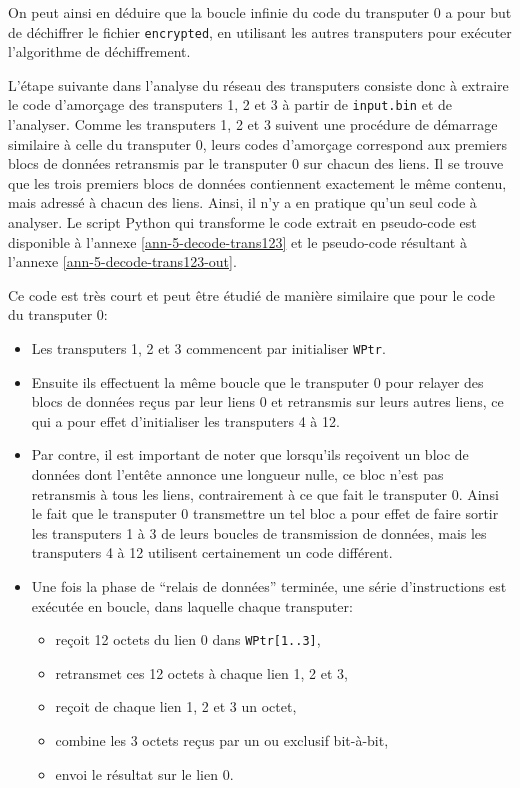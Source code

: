 \documentclass[a4paper,10pt]{article}
\begin{document}
On peut ainsi en déduire que la boucle infinie du code du transputer 0 a pour but de déchiffrer le fichier \texttt{encrypted}, en utilisant les autres transputers pour exécuter l'algorithme de déchiffrement.

L'étape suivante dans l'analyse du réseau des transputers consiste donc à extraire le code d'amorçage des transputers 1, 2 et 3 à partir de \texttt{input.bin} et de l'analyser.
Comme les transputers 1, 2 et 3 suivent une procédure de démarrage similaire à celle du transputer 0, leurs codes d'amorçage correspond aux premiers blocs de données retransmis par le transputer 0 sur chacun des liens.
Il se trouve que les trois premiers blocs de données contiennent exactement le même contenu, mais adressé à chacun des liens.
Ainsi, il n'y a en pratique qu'un seul code à analyser.
Le script Python qui transforme le code extrait en pseudo-code est disponible à l'annexe \ref{ann-5-decode-trans123} et le pseudo-code résultant à l'annexe \ref{ann-5-decode-trans123-out}.

Ce code est très court et peut être étudié de manière similaire que pour le code du transputer 0:
\begin{itemize}
  \item Les transputers 1, 2 et 3 commencent par initialiser \texttt{WPtr}.
  \item Ensuite ils effectuent la même boucle que le transputer 0 pour relayer des blocs de données reçus par leur liens 0 et retransmis sur leurs autres liens, ce qui a pour effet d'initialiser les transputers 4 à 12.
  \item Par contre, il est important de noter que lorsqu'ils reçoivent un bloc de données dont l'entête annonce une longueur nulle, ce bloc n'est pas retransmis à tous les liens, contrairement à ce que fait le transputer 0. Ainsi le fait que le transputer 0 transmettre un tel bloc a pour effet de faire sortir les transputers 1 à 3 de leurs boucles de transmission de données, mais les transputers 4 à 12 utilisent certainement un code différent.
  \item Une fois la phase de ``relais de données'' terminée, une série d'instructions est exécutée en boucle, dans laquelle chaque transputer:
  \begin{itemize}
    \item reçoit 12 octets du lien 0 dans \texttt{WPtr[1..3]},
    \item retransmet ces 12 octets à chaque lien 1, 2 et 3,
    \item reçoit de chaque lien 1, 2 et 3 un octet,
    \item combine les 3 octets reçus par un ou exclusif bit-à-bit,
    \item envoi le résultat sur le lien 0.
  \end{itemize}
\end{itemize}
\end{document}
